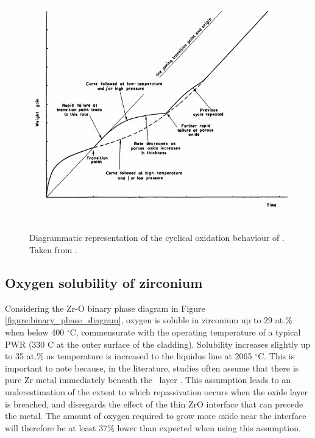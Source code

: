 \begin{figure}[ht]
\centering
\includegraphics[height=10.5cm]{images/zro2_oxide_weight_gain.png}
\caption[Diagrammatic representation of the cyclical oxidation behaviour of \zirconia .]{Diagrammatic representation of the cyclical oxidation behaviour of \zirconia . Taken from \cite{cox1963some}.}
\label{figure:oxide_weight_gain}
\end{figure}

\subsection{Oxygen solubility of zirconium} \label{oxygensolubility}

Considering the Zr-O binary phase diagram in Figure \ref{figure:binary_phase_diagram}, oxygen is soluble in zirconium up to 29 at.\% when below 400 $^{\circ}$C, commensurate with the operating temperature of a typical PWR (330 \textdegree C at the outer surface of the cladding). Solubility increases slightly up to 35 at.\% as temperature is increased to the liquidus line at 2065 $^{\circ}$C. This is important to note because, in the literature, studies often assume that there is pure Zr metal immediately beneath the \zirconia\ layer \cite{rossi2015first}. This assumption leads to an underestimation of the extent to which repassivation occurs when the oxide layer is breached, and disregards the effect of the thin ZrO interface that can precede the metal. The amount of oxygen required to grow more oxide near the interface will therefore be at least 37\% lower than expected when using this assumption.

